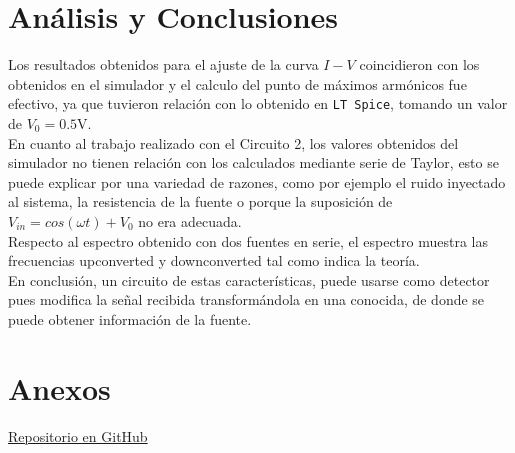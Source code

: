 \documentclass[letterpaper,oneside]{article}
\begin{document}
\section{Análisis y Conclusiones}
Los resultados obtenidos para el ajuste de la curva $I-V$ coincidieron con los obtenidos en el simulador y el calculo del punto de máximos armónicos fue efectivo, ya que tuvieron relación con lo obtenido en \texttt{LT Spice}, tomando un valor de $V_0 = 0.5$V. \\

En cuanto al trabajo realizado con el Circuito 2, los valores obtenidos del simulador no tienen relación con los calculados mediante serie de Taylor, esto se puede explicar por una variedad de razones, como por ejemplo el ruido inyectado al sistema, la resistencia de la fuente o porque la suposición de $V_{in} = cos(\omega t) + V_0$ no era adecuada.\\

Respecto al espectro obtenido con dos fuentes en serie, el espectro muestra las frecuencias upconverted y downconverted tal como indica la teoría.\\

En conclusión, un circuito de estas características, puede usarse como detector pues modifica la señal recibida transformándola en una conocida, de donde se puede obtener información de la fuente.

\section{Anexos}
\href{https://github.com/vecheto/astro_experimental/tree/main/Tarea%203}{Repositorio en GitHub}
\end{document}

